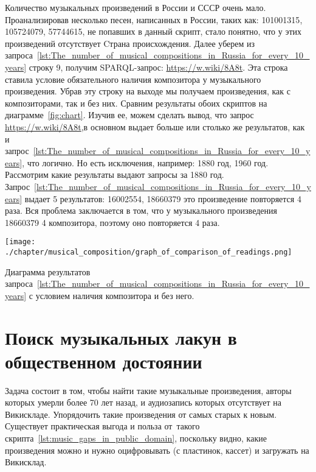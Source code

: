 Количество музыкальных произведений в России и СССР очень мало. Проанализировав несколько песен, написанных в России, таких как:  {101001315},   {105724079},  {57744615}, не попавших в данный скрипт, стало понятно, что у этих произведений отсутствует  {Cтрана происхождения}.
Далее уберем из запроса~\ref{lst:The_number_of_musical_compositions_in_Russia_for_every_10_years} строку 9, получим SPARQL-запрос: \href{https://w.wiki/8A8t}{https://w.wiki/8A8t}. Эта строка ставила условие обязательного наличия композитора у музыкального произведения. Убрав эту строку на выходе мы получаем произведения, как с композиторами, так и без них. Сравним результаты обоих скриптов на диаграмме~\ref{fig:chart}. Изучив ее, можем сделать вывод, что запрос \href{https://w.wiki/8A8t}{https://w.wiki/8A8t},в основном выдает больше или столько же результатов, как и запрос~\ref{lst:The_number_of_musical_compositions_in_Russia_for_every_10_years}, что логично. Но есть исключения, например: 1880 год, 1960 год. Рассмотрим какие результаты выдают запросы за 1880 год. Запрос~\ref{lst:The_number_of_musical_compositions_in_Russia_for_every_10_years} выдает 5 результатов:  {16002554},  {18660379} это произведение повторяется 4 раза. Вся проблема заключается в том, что у музыкального произведения   {18660379} 4 композитора, поэтому оно повторяется 4 раза.

\begin{marginfigure}[0\baselineskip]
	\texttt{[image: ./chapter/musical\_composition/graph\_of\_comparison\_of\_readings.png]}
	\caption[Диаграмма результатов запроса~\ref{lst:The_number_of_musical_compositions_in_Russia_for_every_10_years} с условием наличия композитора и без него.]{Диаграмма результатов запроса~\ref{lst:The_number_of_musical_compositions_in_Russia_for_every_10_years} с условием наличия композитора и без него.}%
	\label{fig:chart}%
\end{marginfigure}

\section{Поиск музыкальных лакун в общественном достоянии}
Задача состоит в том, чтобы найти такие музыкальные произведения, авторы которых умерли более 70 лет назад, и аудиозапись которых отсутствует на Викискладе. Упорядочить такие произведения от самых старых к новым. Существует практическая выгода и польза от~такого скрипта~\ref{lst:music_gaps_in_public_domain}, поскольку видно, какие произведения можно и нужно оцифровывать (с пластинок, кассет) и загружать на Викисклад.

